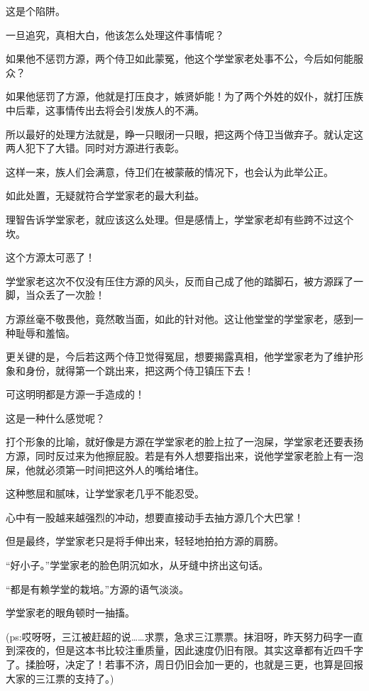 \begin{this_body}
这是个陷阱。

一旦追究，真相大白，他该怎么处理这件事情呢？

如果他不惩罚方源，两个侍卫如此蒙冤，他这个学堂家老处事不公，今后如何能服众？

如果他惩罚了方源，他就是打压良才，嫉贤妒能！为了两个外姓的奴仆，就打压族中后辈，这事情传出去将会引发族人的不满。

所以最好的处理方法就是，睁一只眼闭一只眼，把这两个侍卫当做弃子。就认定这两人犯下了大错。同时对方源进行表彰。

这样一来，族人们会满意，侍卫们在被蒙蔽的情况下，也会认为此举公正。

如此处置，无疑就符合学堂家老的最大利益。

理智告诉学堂家老，就应该这么处理。但是感情上，学堂家老却有些跨不过这个坎。

这个方源太可恶了！

学堂家老这次不仅没有压住方源的风头，反而自己成了他的踏脚石，被方源踩了一脚，当众丢了一次脸！

方源丝毫不敬畏他，竟然敢当面，如此的针对他。这让他堂堂的学堂家老，感到一种耻辱和羞恼。

更关键的是，今后若这两个侍卫觉得冤屈，想要揭露真相，他学堂家老为了维护形象和身份，就得第一个跳出来，把这两个侍卫镇压下去！

可这明明都是方源一手造成的！

这是一种什么感觉呢？

打个形象的比喻，就好像是方源在学堂家老的脸上拉了一泡屎，学堂家老还要表扬方源，同时反过来为他擦屁股。若是有外人想要指出来，说他学堂家老脸上有一泡屎，他就必须第一时间把这外人的嘴给堵住。

这种憋屈和腻味，让学堂家老几乎不能忍受。

心中有一股越来越强烈的冲动，想要直接动手去抽方源几个大巴掌！

但是最终，学堂家老只是将手伸出来，轻轻地拍拍方源的肩膀。

“好小子。”学堂家老的脸色阴沉如水，从牙缝中挤出这句话。

“都是有赖学堂的栽培。”方源的语气淡淡。

学堂家老的眼角顿时一抽搐。

(ps:哎呀呀，三江被赶超的说……求票，急求三江票票。抹泪呀，昨天努力码字一直到深夜的，但是这本书比较注重质量，因此速度仍旧有限。其实这章都有近四千字了。揉脸呀，决定了！若事不济，周日仍旧会加一更的，也就是三更，也算是回报大家的三江票的支持了。)

\end{this_body}

